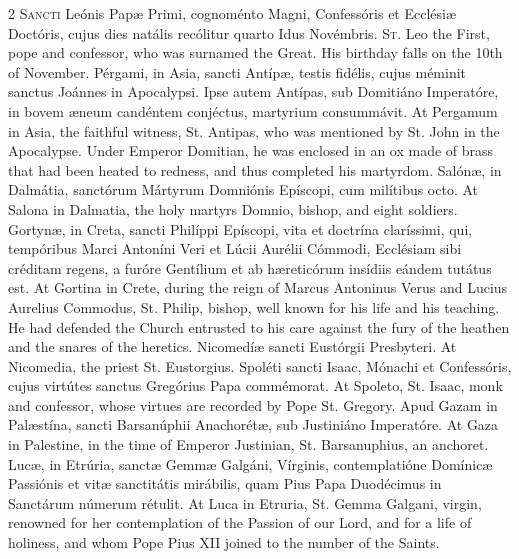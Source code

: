 \begin{paracol}{2}
\lettrine[lines=2]{S}{ancti} Leónis Papæ 
 Primi, cognoménto Magni, Confessóris et Ecclésiæ Doctóris, cujus dies 
 natális recólitur quarto Idus Novémbris.
\switchcolumn
{}
\lettrine[lines=2]{S}{t.} Leo the First, pope and 
 confessor, who was surnamed the Great. His birthday falls on the 10th 
 of November.
\switchcolumn*
{}
Pérgami, in Asia, 
 sancti Antípæ, testis fidélis, cujus méminit sanctus Joánnes in Apocalypsi. 
 Ipse autem Antípas, sub Domitiáno Imperatóre, in bovem æneum candéntem 
 conjéctus, martyrium consummávit.
\switchcolumn
{}
At Pergamum in Asia, the faithful 
 witness, St. Antipas, who was mentioned by St. John in the Apocalypse. 
 Under Emperor Domitian, he was enclosed in an ox made of brass that had been 
 heated to redness, and thus completed his martyrdom.
\switchcolumn*
{}
Salónæ, in Dalmátia, 
 sanctórum Mártyrum Domniónis Epíscopi, cum milítibus octo.
\switchcolumn
{}
At Salona in Dalmatia, the holy 
 martyrs Domnio, bishop, and eight soldiers.
\switchcolumn*
{}
Gortynæ, in Creta, 
 sancti Philíppi Epíscopi, vita et doctrína claríssimi, qui, tempóribus Marci 
 Antoníni Veri et Lúcii Aurélii Cómmodi, Ecclésiam sibi créditam regens, a 
 furóre Gentílium et ab hæreticórum insídiis eándem tutátus est.
\switchcolumn
{}
At Gortina in Crete, during the 
 reign of Marcus Antoninus Verus and Lucius Aurelius Commodus, St. Philip, 
 bishop, well known for his life and his teaching. He had defended the 
 Church entrusted to his care against the fury of the heathen and the snares 
 of the heretics.
\switchcolumn*
{}
Nicomedíæ sancti 
 Eustórgii Presbyteri.
\switchcolumn
{}
At Nicomedia, the priest St. 
 Eustorgius.
\switchcolumn*
{}
Spoléti sancti Isaac, 
 Mónachi et Confessóris, cujus virtútes sanctus Gregórius Papa commémorat.
\switchcolumn
{}
At Spoleto, St. Isaac, monk and 
 confessor, whose virtues are recorded by Pope St. Gregory.
\switchcolumn*
{}
Apud Gazam in 
 Palæstína, sancti Barsanúphii Anachorétæ, sub Justiniáno Imperatóre.
\switchcolumn
{}
At Gaza in Palestine, in the time 
 of Emperor Justinian, St. Barsanuphius, an anchoret.
\switchcolumn*
{}
Lucæ, in Etrúria, 
 sanctæ Gemmæ Galgáni, Vírginis, contemplatióne Domínicæ Passiónis et vitæ 
 sanctitátis mirábilis, quam Pius Papa Duodécimus in Sanctárum númerum 
 rétulit.
\switchcolumn
{}
At Luca in Etruria, St. Gemma 
 Galgani, virgin, renowned for her contemplation of the Passion of our Lord, 
 and for a life of holiness, and whom Pope Pius XII joined to the number of 
 the Saints.
\switchcolumn*
{}
\end{paracol}


